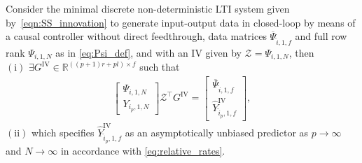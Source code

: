 \begin{thm}\label{theorem:main_result_IVs}
    Consider the minimal discrete non-deterministic \ac{LTI} system given by~\eqref{eqn:SS_innovation} to generate input-output data in closed-loop by means of a causal controller without direct feedthrough, data matrices $\overline{\Psi}_{\hat{i},1,f}$ and full row rank $\Psi_{i,1,N}$ as in \eqref{eq:Psi_def}, and with an \ac{IV} given by $\mathcal{Z}=\Psi_{i,1,N}$, then\\
    $\mathrm{(i)}$ $\exists G^\mathrm{IV}\in\mathbb{R}^{((p+1)r+pl)\times f}$ such that
    \begin{align}\label{eq:TheoremIV}
        \begin{bmatrix}
            \Psi_{i,1,N}\\Y_{i_p,1,N}
        \end{bmatrix}\mathcal{Z}^\top G^\mathrm{IV} =
        \begin{bmatrix}
            \overline{\Psi}_{\hat{i},1,f}\\\widehat{Y}_{\hat{i}_p,1,f}^\mathrm{IV}
        \end{bmatrix},
    \end{align}
    $\mathrm{(ii)}$ which specifies $\widehat{Y}_{\hat{i}_p,1,f}^\mathrm{IV}$ as an asymptotically unbiased predictor as $p\rightarrow\infty$ and $N\rightarrow\infty$ in accordance with \eqref{eq:relative_rates}. %
\end{thm}
%
